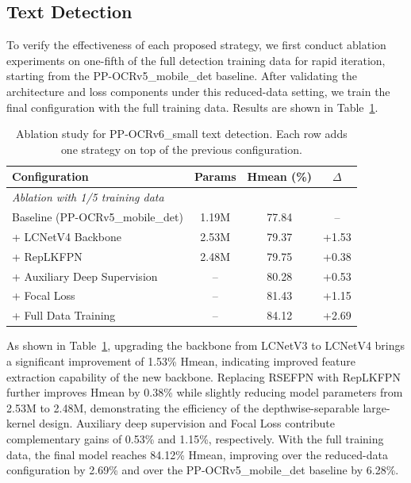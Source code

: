 \documentclass[11pt, a4paper,logo,  copyright, nonumbering]{paddleocr}
\begin{document}
\subsection{Text Detection}
\label{sec:ablation_det}

To verify the effectiveness of each proposed strategy, we first conduct ablation experiments on one-fifth of the full detection training data for rapid iteration, starting from the PP-OCRv5\_mobile\_det baseline. After validating the architecture and loss components under this reduced-data setting, we train the final configuration with the full training data. Results are shown in Table~\ref{tab:det_ablation}.

\begin{table}[h]
\centering
\small
\begin{tabular}{lccc}
\toprule
\textbf{Configuration} & \textbf{Params} & \textbf{Hmean (\%)} & \textbf{$\Delta$} \\
\midrule
\multicolumn{4}{l}{\textit{Ablation with 1/5 training data}} \\
Baseline (PP-OCRv5\_mobile\_det) & 1.19M & 77.84 & -- \\
+ LCNetV4 Backbone & 2.53M & 79.37 & +1.53 \\
+ RepLKFPN & 2.48M & 79.75 & +0.38 \\
+ Auxiliary Deep Supervision & -- & 80.28 & +0.53 \\
+ Focal Loss & -- & 81.43 & +1.15 \\
\midrule
+ Full Data Training & -- & 84.12 & +2.69 \\
\bottomrule
\end{tabular}
\caption{Ablation study for PP-OCRv6\_small text detection. Each row adds one strategy on top of the previous configuration.}
\label{tab:det_ablation}
\end{table}

As shown in Table~\ref{tab:det_ablation}, upgrading the backbone from LCNetV3 to LCNetV4 brings a significant improvement of 1.53\% Hmean, indicating improved feature extraction capability of the new backbone. Replacing RSEFPN with RepLKFPN further improves Hmean by 0.38\% while slightly reducing model parameters from 2.53M to 2.48M, demonstrating the efficiency of the depthwise-separable large-kernel design. Auxiliary deep supervision and Focal Loss contribute complementary gains of 0.53\% and 1.15\%, respectively. With the full training data, the final model reaches 84.12\% Hmean, improving over the reduced-data configuration by 2.69\% and over the PP-OCRv5\_mobile\_det baseline by 6.28\%.
\end{document}
